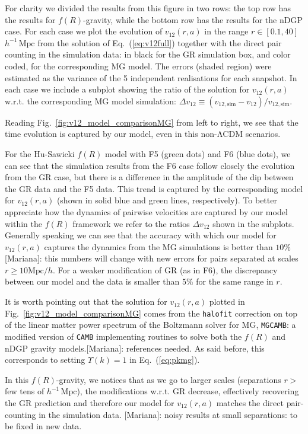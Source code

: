 \documentclass[%
 reprint,
groupedaddress,
nofootinbib,
nobibnotes,
 amsmath,amssymb,
 aps,
]{revtex4-2}
\newcommand{\code}[1]{{\texttt{#1}}}
\newcommand{\refeq}[1]{Eq.~(\ref{eq:#1})}
\newcommand{\reffig}[1]{Fig.~\ref{fig:#1}}
\newcommand{\pairvel}{$v_{12}(r,a)$}
\newcommand{\lcdm}{$\mathrm{\Lambda CDM}$}
\newcommand{\vot}{$v_{12}$}  %
\newcommand{\Mpch}{$h^{-1}\,\mbox{Mpc}$}
\newcommand{\MpchInv}{$\mbox{Mpc}/h$}
\newcommand{\<}{\langle}
\renewcommand{\>}{\rangle}
\newcommand{\MJ}[1]{\textcolor{WildStrawberry}{[Mariana]: #1}}
\begin{document}
For clarity we divided the results from this figure in two rows: the top row has the results for $f(R)$-gravity, while the bottom row has the results for the nDGP case.  For each case we plot the evolution of \pairvel{} in the range $r\in[0.1, 40]$\Mpch{} from the solution of \refeq{v12full}  together with the direct pair counting in the simulation data: in black for the GR simulation box, and color coded, for the corresponding MG model. The errors (shaded region) were estimated as the variance of the 5 independent realisations for each snapshot. In each case we include a subplot showing the ratio of the solution for \pairvel{} w.r.t. the corresponding MG model simulation: $\Delta$\vot{}$\equiv (v_{12, \text{sim}}-v_{12})/v_{12, \text{sim}}$. 

Reading \reffig{v12_model_comparisonMG} from left to right, we see that the time evolution is captured by our model, even in this non-\lcdm{} scenarios.

For the Hu-Sawicki $f(R)$ model with F5 (green dots) and F6 (blue dots), we can see that the simulation results from the F6 case follow closely the evolution from the GR case, but there is a difference in the amplitude of the dip between the GR data and the F5 data. This trend is captured by the corresponding model for \pairvel{} (shown in solid blue and green lines, respectively). To better appreciate how the dynamics of pairwise velocities are captured by our model within the $f(R)$ framework we refer to the ratios $\Delta v_{12}$ shown in the subplots. Generally speaking we can see that the accuracy with which our model for \pairvel{} captures the dynamics from the MG simulations is better than $10\%$ \MJ{this numbers will change with new errors} for pairs separated at scales  $r \geq 10$\MpchInv{}.  For a weaker modification of GR (as in F6), the discrepancy between our model and the data is smaller than $5\%$ for the same range in $r$.

It is worth pointing out that the solution for \pairvel{} plotted in \reffig{v12_model_comparisonMG} comes from the \code{halofit} correction on top of the linear matter power spectrum of the Boltzmann solver for MG, \code{MGCAMB}: a modified version of \code{CAMB} implementing routines to solve both the $f(R)$ and nDGP gravity models.\MJ{references needed}. 
%
As said before, this corresponds to setting $\Upsilon(k)=1$ in \refeq{pkmg}. 

In this $f(R)$-gravity, we notices that as we go to larger scales (separations $r>$ few tens of \Mpch), the modifications w.r.t. GR decrease, effectively recovering the GR prediction and therefore our model for \pairvel{} matches the direct pair-counting in the simulation data.  \MJ{noisy results at small separations: to be fixed in new data. }
\end{document}
